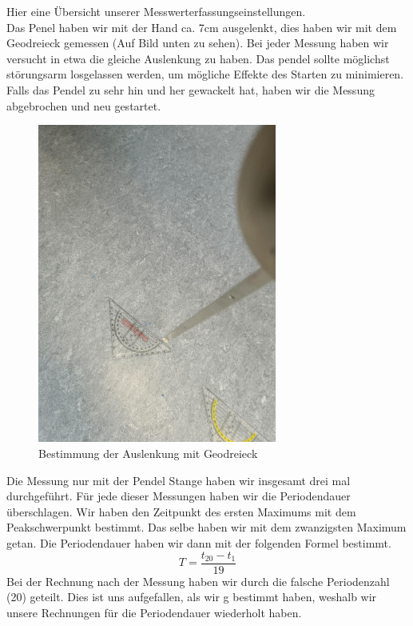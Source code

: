 \documentclass[twoside]{protokoll}
\begin{document}
Hier eine Übersicht unserer Messwerterfassungseinstellungen.\\
Das Penel haben wir mit der Hand ca. 7cm ausgelenkt, dies haben wir mit dem Geodreieck gemessen (Auf Bild unten zu sehen). 
Bei jeder Messung haben wir versucht in etwa die gleiche Auslenkung zu haben. 
Das pendel sollte möglichst störungsarm losgelassen werden, um mögliche Effekte des Starten zu minimieren. 
Falls das Pendel zu sehr hin und her gewackelt hat, haben wir die Messung abgebrochen und neu gestartet.\\
\begin{figure}[H]
    \centering
    \includegraphics[width=0.7\textwidth]{Bilder/geodreieck.pdf}
    \caption{Bestimmung der Auslenkung mit Geodreieck}
    \end{figure}
Die Messung nur mit der Pendel Stange haben wir insgesamt drei mal durchgeführt. 
Für jede dieser Messungen haben wir die Periodendauer überschlagen.
Wir haben den Zeitpunkt des ersten Maximums mit dem Peakschwerpunkt bestimmt. Das selbe haben wir mit dem zwanzigsten Maximum getan. 
Die Periodendauer haben wir dann mit der folgenden Formel bestimmt.
\begin{equation}
T = \frac{t_{20} - t_{1}}{19}
\end{equation}
Bei der Rechnung nach der Messung haben wir durch die falsche Periodenzahl (20) geteilt. 
Dies ist uns aufgefallen, als wir g bestimmt haben, weshalb wir unsere Rechnungen für die Periodendauer wiederholt haben.\\
\end{document}
